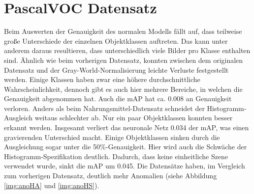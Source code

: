 \section{PascalVOC Datensatz}
Beim Auswerten der Genauigkeit des normalen Modells fällt auf, dass teilweise große Unterschiede der einzelnen Objektklassen auftreten. Das kann unter anderem daraus resultieren, dass unterschiedlich viele Bilder pro Klasse enthalten sind. Ähnlich wie beim vorherigen Datensatz, konnten zwischen dem originalen Datensatz und der Gray-World-Normalisierung leichte Verluste festgestellt werden. Einige Klassen haben zwar eine höhere durchschnittliche Wahrscheinlichkeit, dennoch gibt es auch hier mehrere Bereiche, in welchen die Genauigkeit abgenommen hat. Auch die mAP hat ca. 0.008 an Genauigkeit verloren. Anders als beim Nahrungsmittel-Datensatz schneidet der Histogramm-Ausgleich weitaus schlechter ab. Nur ein paar Objektklassen konnten besser erkannt werden. Insgesamt verliert das neuronale Netz 0.034 der mAP, was einen gravierenden Unterschied macht. Einige Objektklassen sinken durch die Ausgleichung sogar unter die 50\%-Genauigkeit. Hier wird auch die Schwäche der Histogramm-Spezifikation deutlich. Dadurch, dass keine einheitliche Szene verwendet wurde, sinkt die mAP um 0.045. Die Datensätze haben, im Vergleich zum vorherigen Datensatz, deutlich mehr Anomalien (siehe Abbildung \ref{img:anoHA} und \ref{img:anoHS}).
